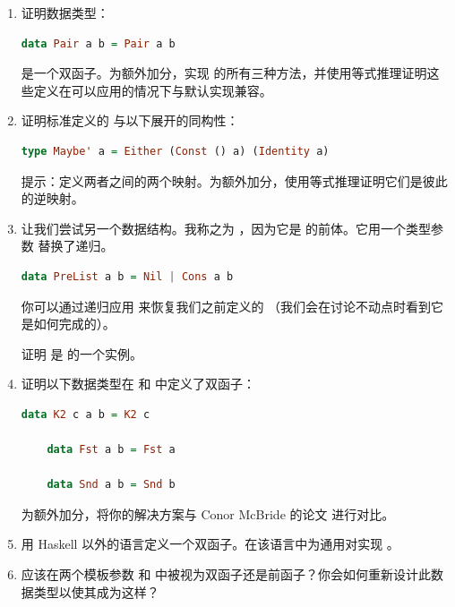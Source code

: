 \begin{enumerate}
  \tightlist
  \item
  证明数据类型：

  \begin{lstlisting}[language=Haskell]
    data Pair a b = Pair a b
  \end{lstlisting}

  是一个双函子。为额外加分，实现  的所有三种方法，并使用等式推理证明这些定义在可以应用的情况下与默认实现兼容。
  \item
  证明标准定义的  与以下展开的同构性：

  \begin{lstlisting}[language=Haskell]
    type Maybe' a = Either (Const () a) (Identity a)
  \end{lstlisting}

  提示：定义两者之间的两个映射。为额外加分，使用等式推理证明它们是彼此的逆映射。
  \item
  让我们尝试另一个数据结构。我称之为 ，因为它是  的前体。它用一个类型参数  替换了递归。

  \begin{lstlisting}[language=Haskell]
    data PreList a b = Nil | Cons a b
  \end{lstlisting}

  你可以通过递归应用  来恢复我们之前定义的 （我们会在讨论不动点时看到它是如何完成的）。

  证明  是  的一个实例。
  \item
  证明以下数据类型在  和  中定义了双函子：

  \begin{lstlisting}[language=Haskell]
    data K2 c a b = K2 c

    data Fst a b = Fst a

    data Snd a b = Snd b
  \end{lstlisting}

  为额外加分，将你的解决方案与 Conor McBride 的论文  进行对比。
  \item
  用 Haskell 以外的语言定义一个双函子。在该语言中为通用对实现 。
  \item
   应该在两个模板参数  和  中被视为双函子还是前函子？你会如何重新设计此数据类型以使其成为这样？
\end{enumerate}
